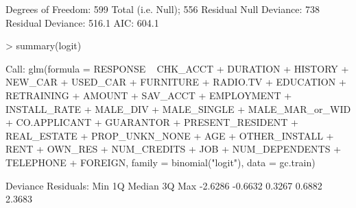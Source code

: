 \documentclass{article}
\begin{document}
\begin{Schunk}
\begin{Soutput}
Degrees of Freedom: 599 Total (i.e. Null);  556 Residual
Null Deviance:	    738 
Residual Deviance: 516.1 	AIC: 604.1
\end{Soutput}
\begin{Sinput}
> summary(logit)
\end{Sinput}
\begin{Soutput}
Call:
glm(formula = RESPONSE ~ CHK_ACCT + DURATION + HISTORY + NEW_CAR + 
    USED_CAR + FURNITURE + RADIO.TV + EDUCATION + RETRAINING + 
    AMOUNT + SAV_ACCT + EMPLOYMENT + INSTALL_RATE + MALE_DIV + 
    MALE_SINGLE + MALE_MAR_or_WID + CO.APPLICANT + GUARANTOR + 
    PRESENT_RESIDENT + REAL_ESTATE + PROP_UNKN_NONE + AGE + OTHER_INSTALL + 
    RENT + OWN_RES + NUM_CREDITS + JOB + NUM_DEPENDENTS + TELEPHONE + 
    FOREIGN, family = binomial("logit"), data = gc.train)

Deviance Residuals: 
    Min       1Q   Median       3Q      Max  
-2.6286  -0.6632   0.3267   0.6882   2.3683  


\end{Soutput}
\end{Schunk}
\end{document}
